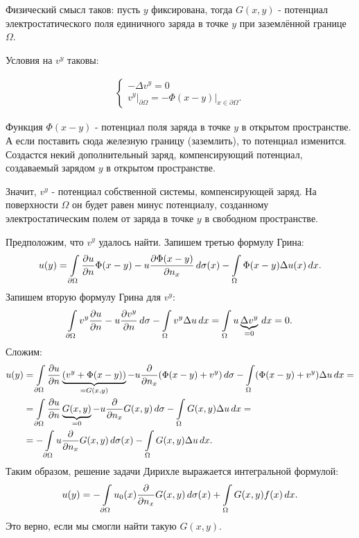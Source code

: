 Физический смысл таков: пусть $y$ фиксирована, тогда $G(x,y)$ - потенциал электростатического поля единичного заряда в точке $y$ при заземлённой границе $\Omega$.

Условия на $v^y$ таковы:

\begin{align*}
	\begin{cases*}
		- \Delta v^y = 0 \\
		v^y\Big\rvert_{\partial \Omega} = - \Phi(x-y)\Big\rvert_{x \in \partial \Omega}.
	\end{cases*}
\end{align*}

Функция $\Phi(x-y)$ - потенциал поля заряда в точке $y$ в открытом пространстве. А если поставить сюда железную границу (заземлить), то потенциал изменится. Создастся некий дополнительный заряд, компенсирующий потенциал, создаваемый зарядом $y$ в открытом пространстве.

Значит, $v^y$ - потенциал собственной системы, компенсирующей заряд. На поверхности $\Omega$ он будет равен минус потенциалу, созданному электростатическим полем от заряда в точке $y$ в свободном пространстве.

Предположим, что $v^y$ удалось найти. Запишем третью формулу Грина:
$$ u(y) = \int \limits_{\partial \Omega} \pder[u]{n} \Phi (x-y) - u \pder[\Phi(x-y)]{n_x} \, d\sigma(x) - \int \limits_\Omega \Phi (x -y) \Delta u(x) \, dx.$$
Запишем вторую формулу Грина для $v^y$:
$$ \int \limits_{\partial \Omega} v^y \pder[u]{n} - u \pder[v^y]{n} \, d\sigma - \int \limits_\Omega v^y \Delta u \, dx = \int \limits_{\Omega} u \underbrace{\Delta v^y}_{ = 0} \, dx = 0.$$
Сложим:
\begin{align*}
	u(y) & = \int \limits_{\partial \Omega} \pder[u]{n} \underbrace{(v^y + \Phi (x-y))}_{=G(x,y)} - u \pder{n_x} (\Phi (x-y) + v^y) \, d\sigma - \int \limits_\Omega (\Phi (x-y) + v^y) \Delta u \, dx = \\
	& = \int \limits_{\partial \Omega} \pder[u]{n} \underbrace{G(x,y)}_{=0} - u \pder{n_x} G(x,y) \, d\sigma - \int \limits_\Omega G(x,y) \Delta u \, dx = \\
	& = - \int \limits_{\partial \Omega} u \pder{n_x} G(x,y) \, d\sigma(x) - \int \limits_\Omega G(x,y) \Delta u \, dx.
\end{align*}
Таким образом, решение задачи Дирихле выражается интегральной формулой:
$$ u(y) = - \int \limits_{\partial \Omega} u_0(x) \pder{n_x} G(x,y) \, d\sigma(x) + \int \limits_\Omega G(x,y) f(x) \, dx.$$
Это верно, если мы смогли найти такую $G(x,y)$.

